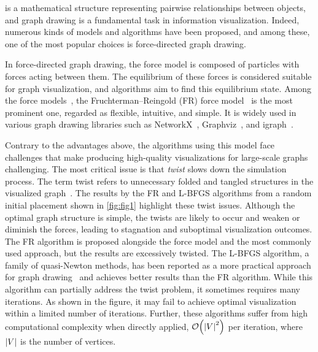 \documentclass[dvipdfmx,10pt,journal,compsoc]{IEEEtran}
\begin{document}
 is a mathematical structure representing pairwise relationships between objects, and graph drawing is a fundamental task in information visualization.
Indeed, numerous kinds of models and algorithms have been proposed, and among these, one of the most popular choices is force-directed graph drawing.

In force-directed graph drawing, the force model is composed of particles with forces acting between them.
The equilibrium of these forces is considered suitable for graph visualization, and algorithms aim to find this equilibrium state.
Among the force models~\cite{eades1984heuristic,kamadaAlgorithmDrawingGeneral1989}, the Fruchterman--Reingold (FR) force model~\cite{fruchtermanGraphDrawingForcedirected1991,kobourovSpringEmbeddersForce2012} is the most prominent one, regarded as flexible, intuitive, and simple.
It is widely used in various graph drawing libraries such as NetworkX~\cite{hagberg2008exploring}, Graphviz~\cite{ellsonGraphvizOpenSource2002}, and igraph~\cite{csardiIgraphSoftwarePackage2006}.

Contrary to the advantages above, the algorithms using this model face challenges that make producing high-quality visualizations for large-scale graphs challenging.
The most critical issue is that \emph{twist} slows down the simulation process.
The term twist refers to unnecessary folded and tangled structures in the visualized graph~\cite{veldhuizenDynamicMultilevelGraph2007,cheongSnapshotVisualizationComplex2018}.
The results by the FR and L-BFGS algorithms from a random initial placement shown in \cref{fig:fig1} highlight these twist issues.
Although the optimal graph structure is simple, the twists are likely to occur and weaken or diminish the forces, leading to stagnation and suboptimal visualization outcomes.
The FR algorithm is proposed alongside the force model and the most commonly used approach, but the results are excessively twisted.
The L-BFGS algorithm, a family of quasi-Newton methods, has been reported as a more practical approach for graph drawing~\cite{6183577} and achieves better results than the FR algorithm.
While this algorithm can partially address the twist problem, it sometimes requires many iterations. As shown in the figure, it may fail to achieve optimal visualization within a limited number of iterations.
Further, these algorithms suffer from high computational complexity when directly applied, $\order{\abs{V}^2}$ per iteration, where $\abs{V}$ is the number of vertices.
\end{document}
